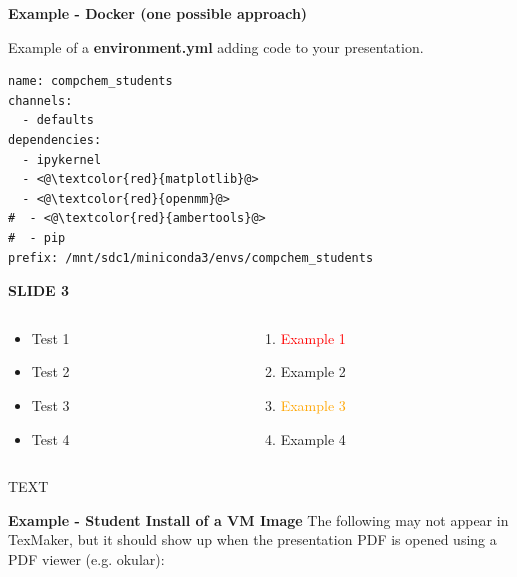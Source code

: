 \documentclass[11pt,vertical]{beamer}
\begin{document}
\begin{frame}[fragile]{\small \textbf{Example - Docker (one possible approach)}}
\small

\vfill
Example of a \textbf{\textcolor{HBRS}{environment.yml}} adding code to your presentation.
\begin{lstlisting}
name: compchem_students
channels:
  - defaults
dependencies:
  - ipykernel
  - <@\textcolor{red}{matplotlib}@>
  - <@\textcolor{red}{openmm}@>
#  - <@\textcolor{red}{ambertools}@>
#  - pip
prefix: /mnt/sdc1/miniconda3/envs/compchem_students
\end{lstlisting}
\end{frame}

\begin{frame}{\small \textbf{SLIDE 3}}
	\small
	\begin{columns}
	
		\begin{column}[t]{0.4\textwidth}
			\begin{itemize}
				\item Test 1
				\item Test 2
				\item Test 3
				\item Test 4
			\end{itemize}
		\end{column}
		
		\begin{column}[t]{0.4\textwidth}
			\begin{enumerate}
				\item \textcolor{red}{Example 1}
				\item \textcolor{HBRS}{Example 2}
				\item \textcolor{orange}{Example 3}
				\item Example 4
			\end{enumerate}
		\end{column}
		
	\end{columns}
	\vfill
	\lhline
	\LARGE
	TEXT
	\vfill


\end{frame}

\begin{frame}{\small \textbf{Example - Student Install of a VM Image}}
	\center
	The following may not appear in TexMaker, but it should show up when the presentation PDF is opened using a PDF viewer (e.g. okular):
	\vfill
\end{frame}
\end{document}
